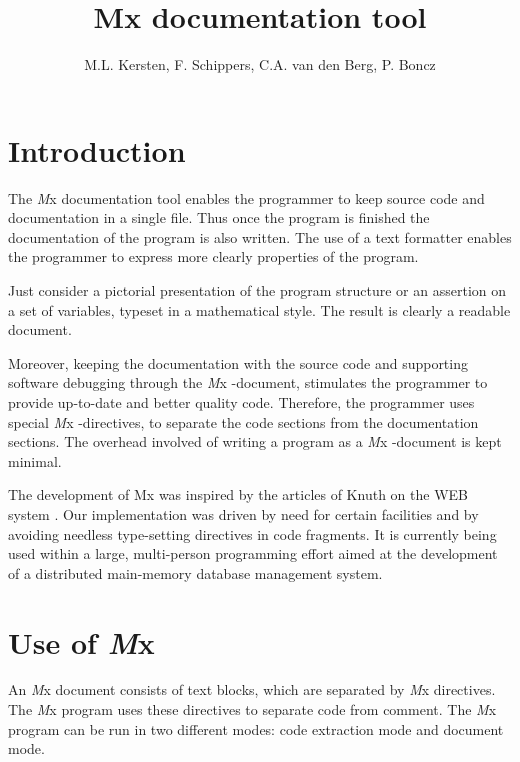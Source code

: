\documentclass{article}
\begin{document}
\newcommand{\Mx}{{\it M}x }
\begin{htmlonly}
\newcommand{\Lc}[1]{\it{\char92#1}}
\end{htmlonly}
\newcommand{\Lc}[1]{$\backslash #1$}

\title{Mx documentation tool}
\author{M.L. Kersten, F. Schippers, C.A. van den Berg, P. Boncz}
\maketitle

\section{Introduction}
The \Mx documentation tool enables the programmer to keep 
source code and documentation in a single file. Thus once the program 
is finished the documentation of the program is also written. 
The use of a text formatter enables the programmer to express more 
clearly properties of the program. 

Just consider a pictorial presentation of the program structure or an 
assertion on a set of variables, typeset in a mathematical style. 
The result is clearly a readable document. 

Moreover, keeping the documentation with the source code
and supporting software debugging through the \Mx-document,
stimulates the programmer to provide up-to-date and better quality code.
Therefore, the programmer uses special \Mx-directives, to separate
the code sections from the documentation sections. 
The overhead involved of writing a program as a \Mx-document is 
kept minimal.

The development of Mx was inspired by the articles of Knuth on the
WEB system \cite{Literate} \cite{Programming}. 
Our implementation was driven by need for certain facilities
and by avoiding needless type-setting directives in code fragments.
It is currently being used within a large, multi-person programming
effort aimed at the development of a distributed main-memory database
management system.

\newpage
\section{Use of \Mx}
An \Mx document consists of text blocks, which are separated by \Mx
directives. The \Mx program uses these directives to separate code
from comment. The \Mx program can be run in two different modes:
code extraction mode and document mode. 
\end{document}
